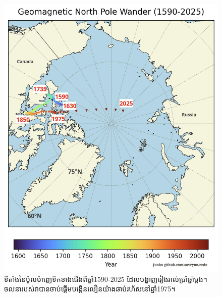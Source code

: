 \documentclass[10pt,twocolumn,letterpaper]{article}
\begin{document}
\begin{figure}[t]
\begin{center}
   \includegraphics[width=1\linewidth]{npw.jpg}
\end{center}
   \caption{ទីតាំងនៃប៉ូលម៉ាញេទិកខាងជើងពីឆ្នាំ1590-2025 ដែលបង្ហាញរៀងរាល់ប្រាំឆ្នាំម្តង។ ចលនារបស់វាបានចាប់ផ្តើមបង្កើនលឿនយ៉ាងឆាប់រហ័សនៅឆ្នាំ1975។}
\label{fig:13}
\label{fig:onecol}
\end{figure}
\end{document}
